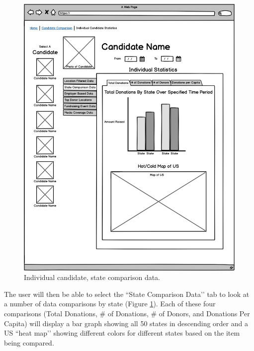\documentclass[12pt]{article}
\begin{document}
    \begin{figure}[H]
        \begin{center}
        \includegraphics[scale=.30]{candidatestate}
        \caption{Individual candidate, state comparison data.}
        \label{fig:9}
        \end{center}
    \end{figure}
    The user will then be able to select the ``State Comparison Data’’ tab to look at a number of data comparisons by state (Figure \ref{fig:9}). Each of these four comparisons (Total Donations, \# of Donations, \# of Donors, and Donations Per Capita) will display a bar graph showing all 50 states in descending order and a US ``heat map’’ showing different colors for different states based on the item being compared.
\end{document}
